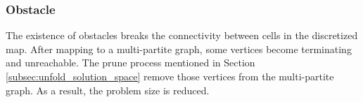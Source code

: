\subsubsection{Obstacle}
\label{subsubsec:obstacle}

The existence of obstacles breaks the connectivity between cells in the discretized map.
After mapping to a multi-partite graph, some vertices become terminating and unreachable.
The prune process mentioned in Section \ref{subsec:unfold_solution_space} remove those vertices from the multi-partite graph.
As a result, the problem size is reduced.